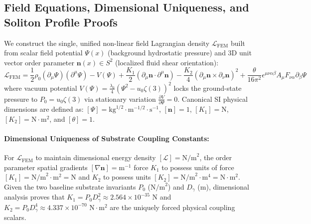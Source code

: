 \documentclass[11pt,a4paper]{article}
\begin{document}
	\subsection{Field Equations, Dimensional Uniqueness, and Soliton Profile Proofs}
	We construct the single, unified non-linear field Lagrangian density $\mathcal{L}_{\text{FEM}}$ built from scalar field potential $\Psi(x)$ (background hydrostatic pressure) and 3D unit vector order parameter $\mathbf{n}(x) \in S^2$ (localized fluid shear orientation):
	\begin{equation}
		\mathcal{L}_{\text{FEM}} = \frac{1}{2} \rho_0 (\partial_\mu \Psi)(\partial^\mu \Psi) - V(\Psi) + \frac{K_1}{2} (\partial_\mu \mathbf{n} \cdot \partial^\mu \mathbf{n}) - \frac{K_2}{4} (\partial_\mu \mathbf{n} \times \partial_\nu \mathbf{n})^2 + \frac{\theta}{16\pi^2} \epsilon^{\mu\nu\alpha\beta} A_\mu F_{\nu\alpha} \partial_\beta \Psi
	\end{equation}
	where vacuum potential $V(\Psi) = \frac{\lambda_0}{4} \left( \Psi^2 - u_0 \zeta(3) \right)^2$ locks the ground-state pressure to $P_0 = u_0 \zeta(3)$ via stationary variation $\frac{\partial V}{\partial \Psi} = 0$. Canonical SI physical dimensions are defined as: $[\Psi] = \text{kg}^{1/2} \cdot \text{m}^{-1/2} \cdot \text{s}^{-1}$, $[\mathbf{n}] = 1$, $[K_1] = \text{N}$, $[K_2] = \text{N}\cdot\text{m}^2$, and $[\theta] = 1$.
	
	\paragraph{Dimensional Uniqueness of Substrate Coupling Constants:}
	For $\mathcal{L}_{\text{FEM}}$ to maintain dimensional energy density $[\mathcal{L}] = \text{N/m}^2$, the order parameter spatial gradients $[\nabla \mathbf{n}] = \text{m}^{-1}$ force $K_1$ to possess units of force $[K_1] = \text{N/m}^2 \cdot \text{m}^2 = \text{N}$ and $K_2$ to possess units $[K_2] = \text{N/m}^2 \cdot \text{m}^4 = \text{N}\cdot\text{m}^2$. Given the two baseline substrate invariants $P_0$ ($\text{N/m}^2$) and $D_\gamma$ ($\text{m}$), dimensional analysis proves that $K_1 = P_0 D_\gamma^2 \approx 2.564 \times 10^{-35}\text{ N}$ and $K_2 = P_0 D_\gamma^4 \approx 4.337 \times 10^{-70}\text{ N}\cdot\text{m}^2$ are the uniquely forced physical coupling scalars.
	
\end{document}
